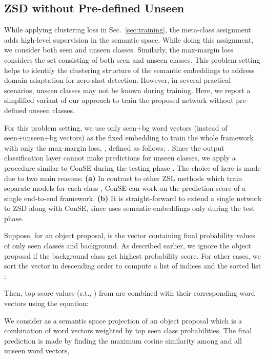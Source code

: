 \documentclass[runningheads]{llncs}
\begin{document}
\subsection{ZSD without Pre-defined Unseen} \label{sec:predefined}
While applying clustering loss in Sec.~\ref{sec:training}, the meta-class assignment adds high-level supervision in the semantic space. While doing this assignment, we consider both seen and unseen classes. Similarly, the max-margin loss considers the set  consisting of both seen and unseen classes. This problem setting helps to identify the clustering structure of the semantic embeddings to address domain adaptation for zero-shot detection. However, in several practical scenarios, unseen classes may not be known during training. Here, we report a simplified variant of our approach to train the proposed network without pre-defined unseen classes.

For this problem setting, we use only seen+bg word vectors (instead of seen+unseen+bg vectors) as the fixed embedding  to train the whole framework with only the max-margin loss, , defined as follows:
. Since the output classification layer cannot make predictions for unseen classes, we apply a procedure similar to ConSE during the testing phase \cite{norouzi_arXiv_2013}. The choice of \cite{norouzi_arXiv_2013} here is made due to two main reasons: \textbf{(a)} In contrast to other ZSL methods which train separate models for each class \cite{Changpinyo_2016_CVPR,rahman2017unified}, ConSE can work on the prediction score of a single end-to-end framework. \textbf{(b)} It is straight-forward to extend a single network to ZSD along with ConSE, since \cite{norouzi_arXiv_2013} uses semantic embeddings only during the test phase. 

Suppose, for an object proposal,  is the vector containing final probability values of only seen classes and background. As described earlier, we ignore the object proposal if the background class get highest probability score. For other cases, we sort the vector  in descending order to compute a list of indices  and the sorted list :

Then, top  score values (s.t., ) from  are combined with their corresponding word vectors using the equation:

We consider  as a semantic space projection of an object proposal which is a combination of word vectors weighted by top  seen class probabilities. The final prediction is made by finding the maximum cosine similarity among  and all unseen word vectors,
\end{document}
